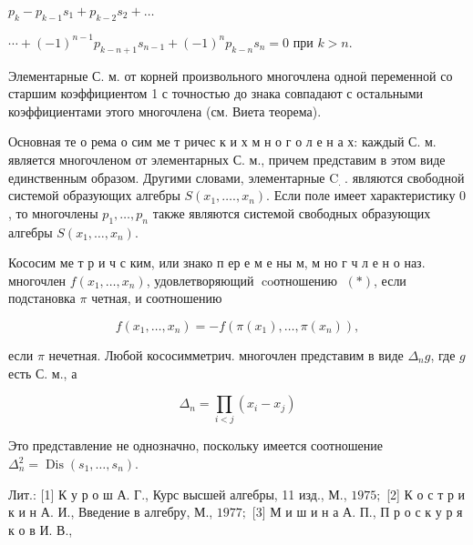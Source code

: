 \documentclass[10pt]{article}
\begin{document}
$p_{k}-p_{k-1} s_{1}+p_{k-2} s_{2}+\ldots$



$\cdots+(-1)^{n-1} p_{k-n+1} s_{n-1}+(-1)^{n} p_{k-n} s_{n}=0$ при $k>n$.



Элементарные С. м. от корней произвольного многочлена одноӥ переменной со старшим коэффициентом 1 с точностью до знака совпадают с остальными коэффициентами этого многочлена (см. Виета теорема).



Основная те о рема о сим ме т ричес к и х м н о г о л е н а х: каждый С. м. является многочленом от элементарных С. м., причем представим в этом виде единственным образом. Другими словами, элементарные $\mathrm{C}_{\text {. }}$. являются свободной системой образующих алгебры $S\left(x_{1}, \ldots ., x_{n}\right)$. Если поле имеет характеристику 0 , то многочлены $p_{1}, \ldots, p_{n}$ также являются системой свободных образующих алгебры $S\left(x_{1}, \ldots, x_{n}\right)$.



Кососим ме т р и ч с ким, или знако п ер е м е ны м, м но г ч л е н о наз. многочлен $f\left(x_{1}, \ldots, x_{n}\right)$, удовлетворяющий $\operatorname{coотношению~}(*)$, если подстановка $\pi$ четная, и соотношению



\[

f\left(x_{1}, \ldots, x_{n}\right)=-f\left(\pi\left(x_{1}\right), \ldots, \pi\left(x_{n}\right)\right),

\]



если $\pi$ нечетная. Любой кососимметрич. многочлен представим в виде $\Delta_{n} g$, где $g$ есть С. м., а



\[

\Delta_{n}=\prod_{i<j}\left(x_{i}-x_{j}\right)

\]



Это представление не однозначно, поскольку имеется соотношение $\Delta_{n}^{2}=\operatorname{Dis}\left(s_{1}, \ldots, s_{n}\right)$.



Лит.: [1] К у р о ш А. Г., Курс высшей алгебры, 11 изд., М., $1975 ;$ [2] К о с т р и к и н А. И., Введение в алгебру, М., $1977 ;$ [3] М и ш и н а А. П., П р о с к у р я к о в И. В.,
\end{document}
